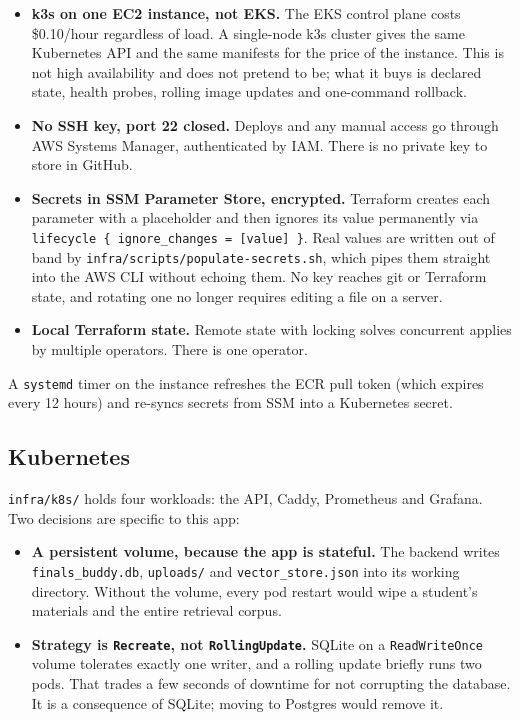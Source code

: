\documentclass[11pt,a4paper]{article}
\newcommand{\code}[1]{\colorbox{fbCream}{\texttt{\small #1}}}
\begin{document}
\begin{itemize}[leftmargin=1.4em]
\item \textbf{k3s on one EC2 instance, not EKS.} The EKS control plane costs
  \$0.10/hour regardless of load. A single-node k3s cluster gives the same
  Kubernetes API and the same manifests for the price of the instance. This is
  not high availability and does not pretend to be; what it buys is declared
  state, health probes, rolling image updates and one-command rollback.
\item \textbf{No SSH key, port 22 closed.} Deploys and any manual access go
  through AWS Systems Manager, authenticated by IAM. There is no private key to
  store in GitHub.
\item \textbf{Secrets in SSM Parameter Store, encrypted.} Terraform creates each
  parameter with a placeholder and then ignores its value permanently via
  \code{lifecycle \{ ignore\_changes = [value] \}}. Real values are written out of
  band by \code{infra/scripts/populate-secrets.sh}, which pipes them straight
  into the AWS CLI without echoing them. No key reaches git or Terraform state,
  and rotating one no longer requires editing a file on a server.
\item \textbf{Local Terraform state.} Remote state with locking solves concurrent
  applies by multiple operators. There is one operator.
\end{itemize}

A \code{systemd} timer on the instance refreshes the ECR pull token (which
expires every 12 hours) and re-syncs secrets from SSM into a Kubernetes secret.

\subsection{Kubernetes}

\code{infra/k8s/} holds four workloads: the API, Caddy, Prometheus and Grafana.
Two decisions are specific to this app:

\begin{itemize}[leftmargin=1.4em]
\item \textbf{A persistent volume, because the app is stateful.} The backend
  writes \code{finals\_buddy.db}, \code{uploads/} and \code{vector\_store.json}
  into its working directory. Without the volume, every pod restart would wipe a
  student's materials and the entire retrieval corpus.
\item \textbf{Strategy is \code{Recreate}, not \code{RollingUpdate}.} SQLite on a
  \code{ReadWriteOnce} volume tolerates exactly one writer, and a rolling update
  briefly runs two pods. That trades a few seconds of downtime for not corrupting
  the database. It is a consequence of SQLite; moving to Postgres would remove it.
\end{itemize}
\end{document}
